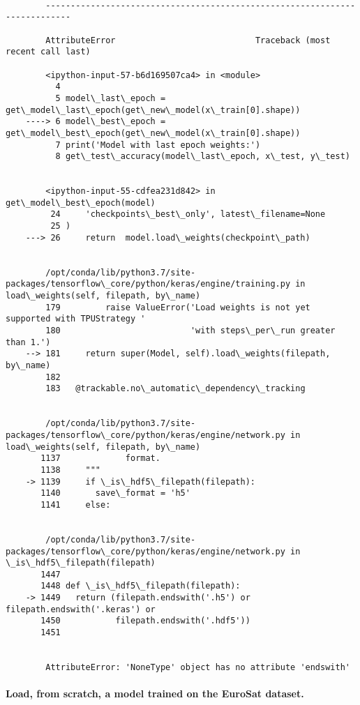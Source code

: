 \documentclass[11pt]{article}
\begin{document}
    \begin{Verbatim}[commandchars=\\\{\}]

        ---------------------------------------------------------------------------

        AttributeError                            Traceback (most recent call last)

        <ipython-input-57-b6d169507ca4> in <module>
          4 
          5 model\_last\_epoch = get\_model\_last\_epoch(get\_new\_model(x\_train[0].shape))
    ----> 6 model\_best\_epoch = get\_model\_best\_epoch(get\_new\_model(x\_train[0].shape))
          7 print('Model with last epoch weights:')
          8 get\_test\_accuracy(model\_last\_epoch, x\_test, y\_test)


        <ipython-input-55-cdfea231d842> in get\_model\_best\_epoch(model)
         24     'checkpoints\_best\_only', latest\_filename=None
         25 )
    ---> 26     return  model.load\_weights(checkpoint\_path)
    

        /opt/conda/lib/python3.7/site-packages/tensorflow\_core/python/keras/engine/training.py in load\_weights(self, filepath, by\_name)
        179         raise ValueError('Load weights is not yet supported with TPUStrategy '
        180                          'with steps\_per\_run greater than 1.')
    --> 181     return super(Model, self).load\_weights(filepath, by\_name)
        182 
        183   @trackable.no\_automatic\_dependency\_tracking


        /opt/conda/lib/python3.7/site-packages/tensorflow\_core/python/keras/engine/network.py in load\_weights(self, filepath, by\_name)
       1137             format.
       1138     """
    -> 1139     if \_is\_hdf5\_filepath(filepath):
       1140       save\_format = 'h5'
       1141     else:


        /opt/conda/lib/python3.7/site-packages/tensorflow\_core/python/keras/engine/network.py in \_is\_hdf5\_filepath(filepath)
       1447 
       1448 def \_is\_hdf5\_filepath(filepath):
    -> 1449   return (filepath.endswith('.h5') or filepath.endswith('.keras') or
       1450           filepath.endswith('.hdf5'))
       1451 


        AttributeError: 'NoneType' object has no attribute 'endswith'

    \end{Verbatim}

    \hypertarget{load-from-scratch-a-model-trained-on-the-eurosat-dataset.}{%
\paragraph{Load, from scratch, a model trained on the EuroSat
dataset.}\label{load-from-scratch-a-model-trained-on-the-eurosat-dataset.}}
\end{document}
